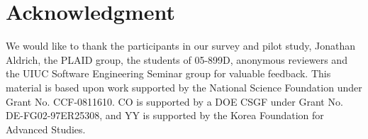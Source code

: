 \documentclass[10pt, conference, compsocconf]{IEEEtran}
\begin{document}
\section*{Acknowledgment}
{We would like to thank the participants in our survey and pilot study, Jonathan Aldrich, the PLAID group, the students of 05-899D, anonymous reviewers and the UIUC Software Engineering Seminar group for valuable feedback. 
This material is based upon work supported by the National Science Foundation under Grant No. CCF-0811610. CO is supported by a DOE CSGF under Grant No. DE-FG02-97ER25308, and YY is supported by the Korea Foundation for Advanced Studies.}



%
%
%

%
\balance 



\end{document}
